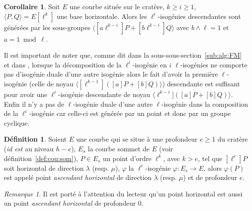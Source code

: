 \documentclass[10pt,a4paper]{book}
\theoremstyle{plain}
\theoremstyle{definition}
\theoremstyle{definition}
\theoremstyle{definition}
\newtheorem{cor}[thm]{Corollaire}
\theoremstyle{definition}
\theoremstyle{definition}
\newtheorem{defi}[thm]{Définition}
\theoremstyle{remark}
\newtheorem{rem}[thm]{Remarque}
\theoremstyle{remark}
\theoremstyle{definition}
\begin{document}
\begin{cor}
Soit $E$ une courbe située sur le cratère, $k\geqslant i \geqslant 1$, 
$\langle P, Q \rangle= E[\ell^k]$ une base horizontale. Alors les 
$\ell^i$-isogénies descendantes sont générées par les sous-groupes 
$\langle [a\ell^{k-i}]P+ [b\ell^{k-i}]Q \rangle$ avec $b \wedge \ell =1$ et 
$a = 1 \bmod \ell$.
\end{cor}
Il est important de noter que, comme dit dans la sous-sous-section~\ref{sub:alg:FM} 
et dans \cite{FouquetMorain02}, lorsque la décomposition de la 
$\ell^i$-isogénie en $i$ $\ell$-isogénies ne comporte pas d'isogénie duale d'une 
autre isogénie alors le fait d'avoir la première $\ell$-isogénie (celle de noyau
$\langle [\ell^{k-1}]([a]P+[b]Q) \rangle$) descendante est suffisant pour avoir
une $\ell^{i}$-isogénie descendante de noyau $\langle \ell^{k-i}]([a]P+[b]Q) 
\rangle$. Enfin il n'y a pas de $\ell$-isogénie duale d'une autre 
$\ell$-isogénie dans la composition de la $\ell^i$-isogénie car celle-ci est 
générée par un point et donc par un groupe cyclique.

\begin{defi}
\label{def:par:hor}
Soient $E$ une courbe qui se situe à une profondeur $e \geqslant 1$ du cratère 
(\emph{id est} au niveau $h-e$),
$E_s$ la courbe sommet de $E$ (voir définition~\ref{def:cou:som}), $P \in E_s$ 
un point d'ordre $\ell^k$, avec $k>e$, tel que $[\ell^e]P$ soit horizontal de 
direction $\lambda$ (resp. $\mu$), $\varphi$ la $\ell^e$-isogénie $\varphi:
E_s \rightarrow E$, alors $\varphi(P)$ est appelé point \emph{ascendant 
horizontal} de direction $\lambda$ (resp. $\mu$) et de profondeur $e$.
\end{defi}

\begin{rem}
Il est porté à l'attention du lecteur qu'un point horizontal est aussi un point
\emph{ascendant horizontal} de profondeur $0$.
\end{rem}
\end{document}
